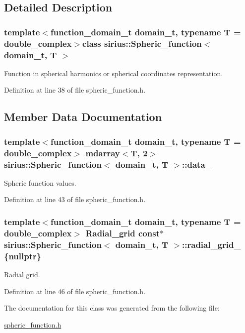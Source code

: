 \subsection{Detailed Description}
\subsubsection*{template$<$function\+\_\+domain\+\_\+t domain\+\_\+t, typename T = double\+\_\+complex$>$class sirius\+::\+Spheric\+\_\+function$<$ domain\+\_\+t, T $>$}

Function in spherical harmonics or spherical coordinates representation. 

Definition at line 38 of file spheric\+\_\+function.\+h.



\subsection{Member Data Documentation}
\hypertarget{classsirius_1_1_spheric__function_a0e8e0f85079304c198fa34be514625b5}{}
\subsubsection[{data\+\_\+}]{\setlength{\rightskip}{0pt plus 5cm}template$<$function\+\_\+domain\+\_\+t domain\+\_\+t, typename T = double\+\_\+complex$>$ {\bf mdarray}$<$T, 2$>$ {\bf sirius\+::\+Spheric\+\_\+function}$<$ domain\+\_\+t, T $>$\+::data\+\_\+\hspace{0.3cm}{\ttfamily [private]}}\label{classsirius_1_1_spheric__function_a0e8e0f85079304c198fa34be514625b5}


Spheric function values. 



Definition at line 43 of file spheric\+\_\+function.\+h.

\hypertarget{classsirius_1_1_spheric__function_aee29fbd6f02106327ae55a7937556122}{}
\subsubsection[{radial\+\_\+grid\+\_\+}]{\setlength{\rightskip}{0pt plus 5cm}template$<$function\+\_\+domain\+\_\+t domain\+\_\+t, typename T = double\+\_\+complex$>$ {\bf Radial\+\_\+grid} const$\ast$ {\bf sirius\+::\+Spheric\+\_\+function}$<$ domain\+\_\+t, T $>$\+::radial\+\_\+grid\+\_\+ \{nullptr\}\hspace{0.3cm}{\ttfamily [private]}}\label{classsirius_1_1_spheric__function_aee29fbd6f02106327ae55a7937556122}


Radial grid. 



Definition at line 46 of file spheric\+\_\+function.\+h.



The documentation for this class was generated from the following file\+:\begin{DoxyCompactItemize}
\item 
\hyperlink{spheric__function_8h}{spheric\+\_\+function.\+h}\end{DoxyCompactItemize}

